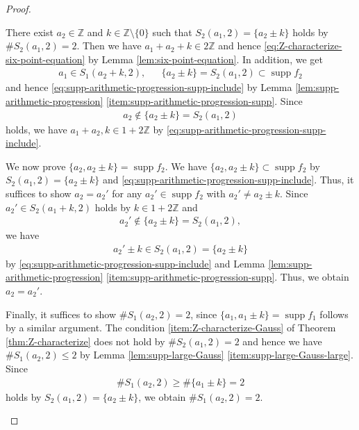 \documentclass[10pt,a4paper]{amsart}
\DeclareMathOperator{\supp}{supp}
\begin{document}
\begin{proof}
\begin{enumerate}
There exist $ a_2 \in \mathbb{ Z } $ and $ k \in \mathbb{ Z } \setminus \{ 0 \} $ such that $ S_2 ( a_1 , 2 ) = \{ a_2 \pm k \} $ holds by $ \# S_2 ( a_1 , 2 ) = 2 $.
Then we have $ a_1 + a_2 + k \in 2 \mathbb{ Z } $ and hence \eqref{eq:Z-characterize-six-point-equation} by Lemma \ref{lem:six-point-equation}.
In addition, we get
\begin{align}
    a_1 \in S_1 ( a_2 + k , 2 ), & &\{ a_2 \pm k \} = S_2 ( a_1 , 2 ) \subset \supp f_2
\end{align}
and hence \eqref{eq:supp-arithmetic-progression-supp-include} by Lemma \ref{lem:supp-arithmetic-progression} \ref{item:supp-arithmetic-progression-supp}.
Since
\begin{align}
    a_2 \notin \{ a_2 \pm k \} = S_2 ( a_1 , 2 )
\end{align}
holds, we have $ a_1 + a_2 , k \in 1 + 2 \mathbb{ Z } $ by \eqref{eq:supp-arithmetic-progression-supp-include}.

We now prove $ \{ a_2 , a_2 \pm k \} = \supp f_2 $.
We have $ \{ a_2 , a_2 \pm k \} \subset \supp f_2 $ by $ S_2 ( a_1 , 2 ) = \{ a_2 \pm k \} $ and \eqref{eq:supp-arithmetic-progression-supp-include}.
Thus, it suffices to show $ a_2 = a_2' $ for any $ a_2' \in \supp f_2 $ with $ a_2' \neq a_2 \pm k $.
Since $ a_2' \in S_2 ( a_1 + k , 2 ) $ holds by $ k \in 1 + 2 \mathbb{ Z } $ and 
\begin{align}
    a_2' \notin \{ a_2 \pm k \} = S_2 ( a_1 , 2 ),
\end{align}
we have
\begin{align}
    a_2' \pm k \in S_2 ( a_1 , 2 ) = \{ a_2 \pm k \}
\end{align}
by \eqref{eq:supp-arithmetic-progression-supp-include} and Lemma \ref{lem:supp-arithmetic-progression} \ref{item:supp-arithmetic-progression-supp}.
Thus, we obtain $ a_2 = a_2' $.

Finally, it suffices to show $ \# S_1 ( a_2 , 2 ) = 2 $, since $ \{ a_1 , a_1 \pm k \} = \supp f_1 $ follows by a similar argument.
The condition \ref{item:Z-characterize-Gauss} of Theorem \ref{thm:Z-characterize} does not hold by $ \# S_2 ( a_1 , 2 ) = 2 $ and hence we have $ \# S_1 ( a_2 , 2 ) \leq 2 $ by Lemma \ref{lem:supp-large-Gauss} \ref{item:supp-large-Gauss-large}.
Since
\begin{align}
   \# S_1 ( a_2 , 2 ) \geq \# \{ a_1 \pm k \} = 2 
\end{align}
holds by $ S_2 ( a_1 , 2 ) = \{ a_2 \pm k \} $, we obtain $ \# S_1 ( a_2 , 2 ) = 2 $.
\qedhere

\end{enumerate}

\end{proof}
\end{document}
